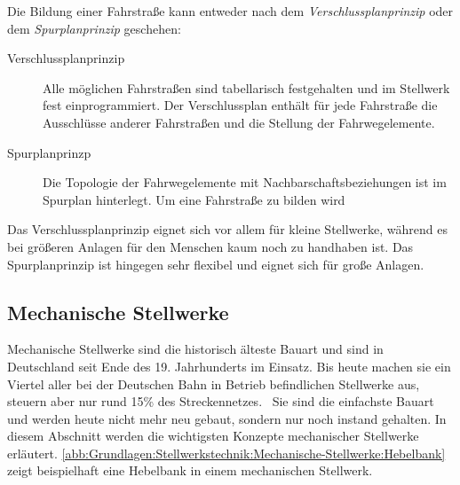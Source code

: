 Die Bildung einer Fahrstraße kann entweder nach dem \textit{Verschlussplanprinzip} oder dem \textit{Spurplanprinzip} geschehen:

\begin{description}
    \item[Verschlussplanprinzip] Alle möglichen Fahrstraßen sind tabellarisch festgehalten und im Stellwerk fest einprogrammiert. Der Verschlussplan enthält für jede Fahrstraße die Ausschlüsse anderer Fahrstraßen und die Stellung der Fahrwegelemente.~\cite[][S. 122 f.]{bib:Sicherung-des-Schienenverkehrs}
    \item[Spurplanprinzp] Die Topologie der Fahrwegelemente mit Nachbarschaftsbeziehungen ist im Spurplan hinterlegt. Um eine Fahrstraße zu bilden wird ~\cite[][S. 123]{bib:Sicherung-des-Schienenverkehrs}
\end{description}

Das Verschlussplanprinzip eignet sich vor allem für kleine Stellwerke, während es bei größeren Anlagen für den Menschen kaum noch zu handhaben ist. Das Spurplanprinzip ist hingegen sehr flexibel und eignet sich für große Anlagen.~\cite[][S. 124 f.]{bib:Sicherung-des-Schienenverkehrs}

\subsection{Mechanische Stellwerke}\label{text:Grundlagen:Stellwerkstechnik:Mechanische-Stellwerke}

Mechanische Stellwerke sind die historisch älteste Bauart und sind in Deutschland seit Ende des 19. Jahrhunderts im Einsatz. Bis heute machen sie ein Viertel aller bei der Deutschen Bahn in Betrieb befindlichen Stellwerke aus, steuern aber nur rund 15\% des Streckennetzes.~\cite{bib:DB:Stellwerke} Sie sind die einfachste Bauart und werden heute nicht mehr neu gebaut, sondern nur noch instand gehalten. In diesem Abschnitt werden die wichtigsten Konzepte mechanischer Stellwerke erläutert. \autoref{abb:Grundlagen:Stellwerkstechnik:Mechanische-Stellwerke:Hebelbank} zeigt beispielhaft eine Hebelbank in einem mechanischen Stellwerk.

